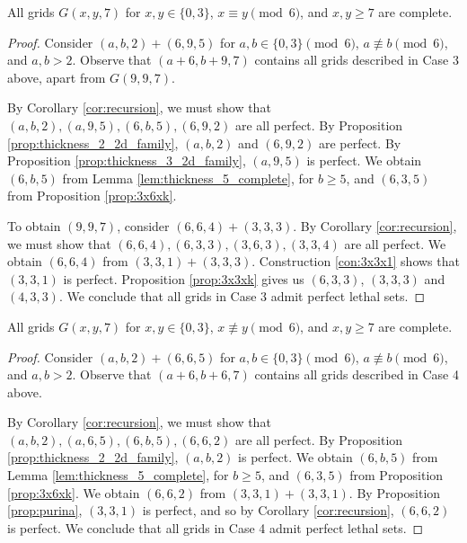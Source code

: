 \begin{lem}
\label{lem:thickness_7_case_3}
All grids $G(x,y,7)$ for $x,y \in \{0,3\}$, $x \equiv y \pmod 6$, and $x,y \geq 7$ are complete.
\end{lem}

\begin{proof}
Consider $(a,b,2) + (6,9,5)$ for $a,b \in \{0,3\} \pmod 6$, $a \not\equiv b \pmod 6$, and $a,b > 2$. Observe that $(a+6,b+9,7)$ contains all grids described in Case 3 above, apart from $G(9,9,7)$. 

By Corollary \ref{cor:recursion}, we must show that $(a,b,2), (a,9,5), (6,b,5), (6,9,2)$ are all perfect. By Proposition \ref{prop:thickness_2_2d_family}, $(a,b,2)$ and $(6,9,2)$ are perfect. By Proposition \ref{prop:thickness_3_2d_family}, $(a,9,5)$ is perfect. We obtain $(6,b,5)$ from Lemma \ref{lem:thickness_5_complete}, for $b \geq 5$, and $(6,3,5)$ from Proposition \ref{prop:3x6xk}. 

To obtain $(9,9,7)$, consider $(6,6,4) + (3,3,3)$. By Corollary \ref{cor:recursion}, we must show that $(6,6,4), (6,3,3), (3,6,3), (3,3,4)$ are all perfect. We obtain $(6,6,4)$ from $(3,3,1) + (3,3,3)$. Construction \ref{con:3x3x1} shows that $(3,3,1)$ is perfect. Proposition \ref{prop:3x3xk} gives us $(6,3,3)$, $(3,3,3)$ and $(4,3,3)$. We conclude that all grids in Case 3 admit perfect lethal sets.
\end{proof}

\begin{lem}
\label{lem:thickness_7_case_4}
All grids $G(x,y,7)$ for $x,y \in \{0,3\}$, $x \not\equiv y \pmod 6$, and $x,y \geq 7$ are complete.
\end{lem}

\begin{proof}
Consider $(a,b,2) + (6,6,5)$ for $a,b \in \{0,3\} \pmod 6$, $a \not\equiv b \pmod 6$, and $a,b > 2$. Observe that $(a+6,b+6,7)$ contains all grids described in Case 4 above. 

By Corollary \ref{cor:recursion}, we must show that $(a,b,2), (a,6,5), (6,b,5), (6,6,2)$ are all perfect. By Proposition \ref{prop:thickness_2_2d_family}, $(a,b,2)$ is perfect. We obtain $(6,b,5)$ from Lemma \ref{lem:thickness_5_complete}, for $b \geq 5$, and $(6,3,5)$ from Proposition \ref{prop:3x6xk}. We obtain $(6,6,2)$ from $(3,3,1)+(3,3,1)$. By Proposition \ref{prop:purina}, $(3,3,1)$ is perfect, and so by Corollary \ref{cor:recursion}, $(6,6,2)$ is perfect. We conclude that all grids in Case 4 admit perfect lethal sets.
\end{proof}

